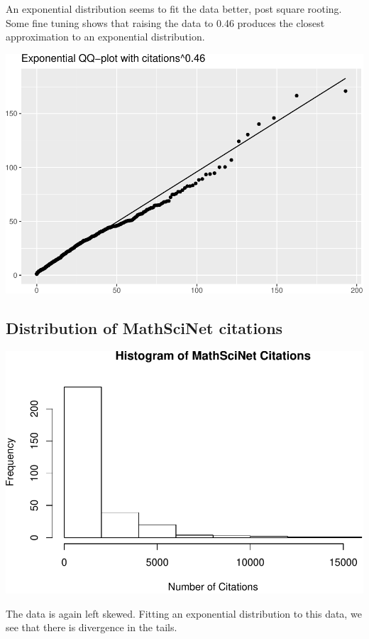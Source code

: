 \documentclass[]{article}
\begin{document}
An exponential distribution seems to fit the data better, post square
rooting. Some fine tuning shows that raising the data to 0.46 produces
the closest approximation to an exponential distribution.

\includegraphics{final_files/figure-latex/unnamed-chunk-10-1.pdf}

\hypertarget{distribution-of-mathscinet-citations}{%
\subsection{Distribution of MathSciNet
citations}\label{distribution-of-mathscinet-citations}}

\includegraphics{final_files/figure-latex/unnamed-chunk-11-1.pdf}

The data is again left skewed. Fitting an exponential distribution to
this data, we see that there is divergence in the tails.
\end{document}

